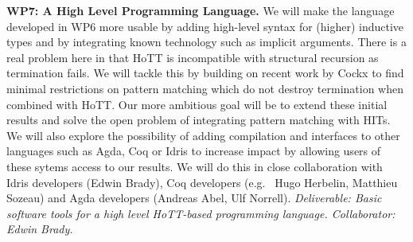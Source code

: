 \documentclass[a4paper,11pt]{article}
\newcommand{\eg}{{e.g.}\ }
\begin{document}
{\bf WP7: A High Level Programming Language.} We will make the
language developed in WP6 more usable by adding high-level syntax for
(higher) inductive types and by integrating known technology such as
implicit arguments. There is a real problem here in that HoTT is
incompatible with structural recursion as termination fails. We will
tackle this by building on recent work by Cockx \cite{cockx-without-k}
to find minimal restrictions on pattern matching which do not destroy
termination when combined with HoTT. Our more ambitious goal will be
to extend these initial results and solve the open problem of
integrating pattern matching with HITs. We will also explore the
possibility of adding compilation and interfaces to other languages
such as Agda, Coq or Idris to increase impact by allowing users of
these sytems access to our results.  We will do this in close
collaboration with Idris developers (Edwin Brady), Coq developers (\eg
Hugo Herbelin, Matthieu Sozeau) and Agda developers (Andreas Abel, Ulf
Norrell).  {\em Deliverable: Basic software tools for a high level
HoTT-based programming language.  Collaborator: Edwin Brady.  }




\end{document}
